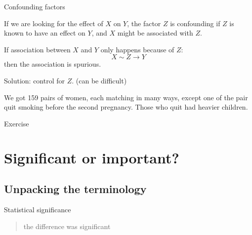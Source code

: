 %
\begin{frame}{Confounding factors}

If we are looking for the effect of $X$ on $Y$,
the factor $Z$ is \alert{confounding} if $Z$ is known to have an effect on $Y$,
and $X$ might be associated with $Z$.

\vspace{2em}

If association between $X$ and $Y$ only happens because of $Z$:
\[
  X \sim Z \longrightarrow Y
\]
then the association is \alert{spurious}.

\vspace{2em}

\alert{Solution:} control for $Z$.  (can be difficult)

\vspace{2em}

 We got 159 pairs of women,
    each matching in many ways, except one of the pair quit smoking before the second pregnancy.
    Those who quit had heavier children.

\end{frame}

\begin{frame}{Exercise}



\end{frame}


\section{Significant or important?}

\subsection{Unpacking the terminology}

\begin{frame}{Statistical significance}

    \begin{quote}
        the difference was significant \\
    \end{quote}



\end{frame}

